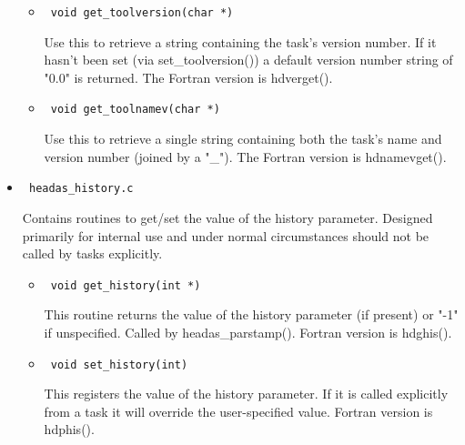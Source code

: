 \documentclass[11pt]{book}
\begin{document}
\begin{itemize}
\begin{itemize}
            \item      \begin{verbatim} void get_toolversion(char *) \end{verbatim} 
                  Use this to retrieve a string containing the
                  task's version number. If it hasn't been set
                  (via set\_toolversion()) a default version
                  number string of "0.0" is returned. The
                  Fortran version is hdverget().

            \item      \begin{verbatim} void get_toolnamev(char *) \end{verbatim} 
                  Use this to retrieve a single string containing
                  both the task's name and version number
                  (joined by a "\_"). The Fortran version is
                  hdnamevget().
            \end{itemize}

\item            \begin{verbatim} headas_history.c \end{verbatim}
            Contains routines to get/set the value of the history
            parameter. Designed primarily for internal use and
            under normal circumstances should not be called by
            tasks explicitly.
            \begin{itemize}

            \item      \begin{verbatim} void get_history(int *) \end{verbatim} 
                  This routine returns the value of the history
                  parameter (if present) or "-1" if unspecified.
                  Called by headas\_parstamp(). Fortran
                  version is hdghis().

            \item      \begin{verbatim} void set_history(int) \end{verbatim} 
                  This registers the value of the history
                  parameter. If it is called explicitly from a task
                  it will override the user-specified value.
                  Fortran version is hdphis().
            \end{itemize}


\end{itemize}
\end{document}
